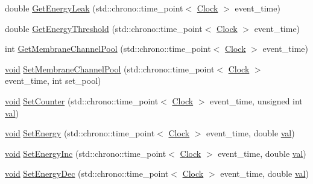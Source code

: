 \begin{DoxyCompactItemize}
double \mbox{\hyperlink{class_membrane_ac6c8d1f7348b24e448e8163260500b89}{Get\+Energy\+Leak}} (std\+::chrono\+::time\+\_\+point$<$ \mbox{\hyperlink{universe_8h_a0ef8d951d1ca5ab3cfaf7ab4c7a6fd80}{Clock}} $>$ event\+\_\+time)
\item 
double \mbox{\hyperlink{class_membrane_a7ce7398888bdad73ac848a2362261acf}{Get\+Energy\+Threshold}} (std\+::chrono\+::time\+\_\+point$<$ \mbox{\hyperlink{universe_8h_a0ef8d951d1ca5ab3cfaf7ab4c7a6fd80}{Clock}} $>$ event\+\_\+time)
\item 
int \mbox{\hyperlink{class_membrane_a270278dd346edfe8c7bbd4c48929fdd5}{Get\+Membrane\+Channel\+Pool}} (std\+::chrono\+::time\+\_\+point$<$ \mbox{\hyperlink{universe_8h_a0ef8d951d1ca5ab3cfaf7ab4c7a6fd80}{Clock}} $>$ event\+\_\+time)
\item 
\mbox{\hyperlink{glad_8h_a950fc91edb4504f62f1c577bf4727c29}{void}} \mbox{\hyperlink{class_membrane_aeda845ea9577e6a07690acad22ef375f}{Set\+Membrane\+Channel\+Pool}} (std\+::chrono\+::time\+\_\+point$<$ \mbox{\hyperlink{universe_8h_a0ef8d951d1ca5ab3cfaf7ab4c7a6fd80}{Clock}} $>$ event\+\_\+time, int set\+\_\+pool)
\item 
\mbox{\hyperlink{glad_8h_a950fc91edb4504f62f1c577bf4727c29}{void}} \mbox{\hyperlink{class_membrane_a4bff43b38d7046867f220392a39cc272}{Set\+Counter}} (std\+::chrono\+::time\+\_\+point$<$ \mbox{\hyperlink{universe_8h_a0ef8d951d1ca5ab3cfaf7ab4c7a6fd80}{Clock}} $>$ event\+\_\+time, unsigned int \mbox{\hyperlink{glad_8h_a26942fd2ed566ef553eae82d2c109c8f}{val}})
\item 
\mbox{\hyperlink{glad_8h_a950fc91edb4504f62f1c577bf4727c29}{void}} \mbox{\hyperlink{class_membrane_a37beeb28761af644bc3a51d3509f14f1}{Set\+Energy}} (std\+::chrono\+::time\+\_\+point$<$ \mbox{\hyperlink{universe_8h_a0ef8d951d1ca5ab3cfaf7ab4c7a6fd80}{Clock}} $>$ event\+\_\+time, double \mbox{\hyperlink{glad_8h_a26942fd2ed566ef553eae82d2c109c8f}{val}})
\item 
\mbox{\hyperlink{glad_8h_a950fc91edb4504f62f1c577bf4727c29}{void}} \mbox{\hyperlink{class_membrane_abd1c69b9b0260799afd3965c34f881ff}{Set\+Energy\+Inc}} (std\+::chrono\+::time\+\_\+point$<$ \mbox{\hyperlink{universe_8h_a0ef8d951d1ca5ab3cfaf7ab4c7a6fd80}{Clock}} $>$ event\+\_\+time, double \mbox{\hyperlink{glad_8h_a26942fd2ed566ef553eae82d2c109c8f}{val}})
\item 
\mbox{\hyperlink{glad_8h_a950fc91edb4504f62f1c577bf4727c29}{void}} \mbox{\hyperlink{class_membrane_acefb2fe781d7316b232614663777cde1}{Set\+Energy\+Dec}} (std\+::chrono\+::time\+\_\+point$<$ \mbox{\hyperlink{universe_8h_a0ef8d951d1ca5ab3cfaf7ab4c7a6fd80}{Clock}} $>$ event\+\_\+time, double \mbox{\hyperlink{glad_8h_a26942fd2ed566ef553eae82d2c109c8f}{val}})

\end{DoxyCompactItemize}
